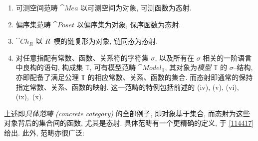 \begin{example}
\begin{enumerate}[label={(\roman*)}, ref = {(\roman*)}]
        \item 可测空间范畴 \(\cat{Mea}\) 以可测空间为对象, 可测函数为态射.
        \item 偏序集范畴 \(\cat{Poset}\) 以偏序集为对象, 保序函数为态射.
        \item \(\cat{Ch}_R\) 以 \(R\)--模的链复形为对象, 链同态为态射.
        \item 对任意指配有常数、函数、关系符的字符集 \(\sigma\), 以及所有在 \(\sigma\) 相关的一阶语言中良构的语句, 构成集 \(\mathbb T\), 可有模型范畴 \(\cat{Model}_{\mathbb T}\), 其对象为\textit{模型} \(\mathbb T\) 的 \(\sigma\)--结构, 亦即配备了满足公理 \(\mathbb T\) 的相应常数、关系、函数的集合. 而态射即通常的保持指定常数、关系、函数的映射. 这一范畴的特例包括前述的 (iv), (v), (vi), (ix),~(x).
    \end{enumerate}
\end{example}
\par 上述即\textit{具体范畴 (concrete category)} 的全部例子, 即对象基于集合, 而态射为这些对象背后的集合间的函数, 尤其是态射. 具体范畴有一个更精确的定义, 于 \ref{114417} 给出. 此外, 范畴亦很广泛:
